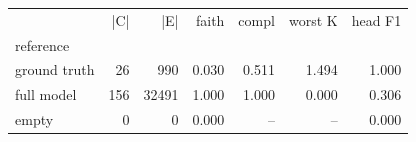 \begin{tabular}{lrrrrrr}
\toprule
 & |C| & |E| & faith & compl & worst K & head F1 \\
reference &  &  &  &  &  &  \\
\midrule
ground truth & 26 & 990 & 0.030 & 0.511 & 1.494 & 1.000 \\
full model & 156 & 32491 & 1.000 & 1.000 & 0.000 & 0.306 \\
empty & 0 & 0 & 0.000 & -- & -- & 0.000 \\
\bottomrule
\end{tabular}

